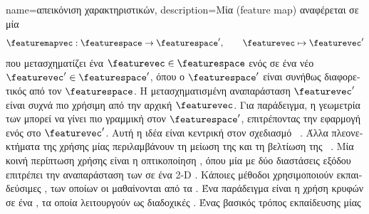 {name={\foreignlanguage{greek}{απεικόνιση χαρακτηριστικών}}, 
	description={\foreignlanguage{greek}{Μία}   
		(feature map) \foreignlanguage{greek}{αναφέρεται σε μία}  
		$$
		\featuremapvec: \featurespace \rightarrow \featurespace', \qquad \featurevec \mapsto \featurevec'
		$$
		\foreignlanguage{greek}{που μετασχηματίζει ένα}  $\featurevec \in \featurespace$ \foreignlanguage{greek}{ενός} 
 		 \foreignlanguage{greek}{σε ένα νέο}  $\featurevec' \in \featurespace'$, 
 		\foreignlanguage{greek}{όπου ο $\featurespace'$ είναι συνήθως διαφορετικός από τον} $\featurespace$.
 		\foreignlanguage{greek}{Η μετασχηματισμένη αναπαράσταση $\featurevec'$ είναι συχνά πιο χρήσιμη από την αρχική $\featurevec$. 
		Για παράδειγμα, η γεωμετρία των}  \foreignlanguage{greek}{μπορεί να γίνει πιο γραμμική στον 
 		$\featurespace'$, επιτρέποντας την εφαρμογή ενός}  \foreignlanguage{greek}{στο} $\featurevec'$. 
 		\foreignlanguage{greek}{Αυτή η ιδέα είναι κεντρική στον σχεδιασμό} ~\cite{LearningKernelsBook}.
 		\foreignlanguage{greek}{Άλλα πλεονεκτήματα της χρήσης μίας}   \foreignlanguage{greek}{περιλαμβάνουν
		τη μείωση της}  \foreignlanguage{greek}{και τη βελτίωση της} ~\cite{Ribeiro2016}. 
		\foreignlanguage{greek}{Μία κοινή περίπτωση χρήσης είναι η οπτικοποίηση} , \foreignlanguage{greek}{όπου μία} 
		  \foreignlanguage{greek}{με δύο διαστάσεις εξόδου επιτρέπει την αναπαράσταση των}
 		 \foreignlanguage{greek}{σε ένα} 2-D . \foreignlanguage{greek}{Κάποιες μέθοδοι}  
		\foreignlanguage{greek}{χρησιμοποιούν εκπαιδεύσιμες}  , \foreignlanguage{greek}{των οποίων οι} 
		 \foreignlanguage{greek}{μαθαίνονται από τα} . \foreignlanguage{greek}{Ένα παράδειγμα είναι η χρήση 
		κρυφών}  \foreignlanguage{greek}{σε ένα} , \foreignlanguage{greek}{τα οποία λειτουργούν ως διαδοχικές} 
		  \cite{MallatUnderstandingDeepLearning}. \foreignlanguage{greek}{Ένας βασικός τρόπος εκπαίδευσης μίας} 
}}
